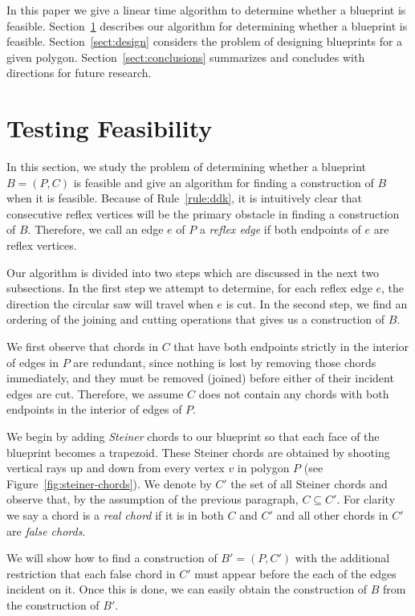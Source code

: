 \documentclass{elsart}
\begin{document}
In this paper we give a linear time algorithm to determine whether a
blueprint is feasible.  Section~\ref{sect:testing} describes our
algorithm for determining whether a blueprint is
feasible. Section~\ref{sect:design} considers the problem of designing
blueprints for a given polygon.  Section~\ref{sect:conclusions}
summarizes and concludes with directions for future research.

\section{Testing Feasibility}
\label{sect:testing}

In this section, we study the problem of determining whether a
blueprint $B=(P,C)$ is feasible and give an algorithm for finding a
construction of $B$ when it is feasible.  Because of
Rule~\ref{rule:ddk}, it is intuitively clear that consecutive reflex
vertices will be the primary obstacle in finding a construction of
$B$.  Therefore, we call an edge $e$ of $P$ a \emph{reflex edge} if
both endpoints of $e$ are reflex vertices.

Our algorithm is divided into two steps which are discussed in the
next two subsections. In the first step we attempt to determine, for
each reflex edge $e$, the direction the circular saw will travel when
$e$ is cut.  In the second step, we find an ordering of the joining
and cutting operations that gives us a construction of $B$.

We first observe that chords in $C$ that have both endpoints strictly
in the interior of edges in $P$ are redundant, since nothing is lost
by removing those chords immediately, and they must be removed
(joined) before either of their incident edges are cut.  Therefore, we
assume $C$ does not contain any chords with both endpoints in the
interior of edges of $P$.

We begin by adding \emph{Steiner} chords to our blueprint so that each
face of the blueprint becomes a trapezoid.  These Steiner chords are
obtained by shooting vertical rays up and down from every vertex $v$
in polygon $P$ (see Figure~\ref{fig:steiner-chords}).  We denote by
$C'$ the set of all Steiner chords and observe that, by the assumption
of the previous paragraph, $C\subseteq C'$.  For clarity we say a
chord is a \emph{real chord} if it is in both $C$ and $C'$ and all
other chords in $C'$ are \emph{false chords}.  

We will show how to find a construction of $B'=(P,C')$ with the
additional restriction that each false chord in $C'$ must appear
before the each of the edges incident on it.  Once this is done, we
can easily obtain the construction of $B$ from the construction of
$B'$.
\end{document}
